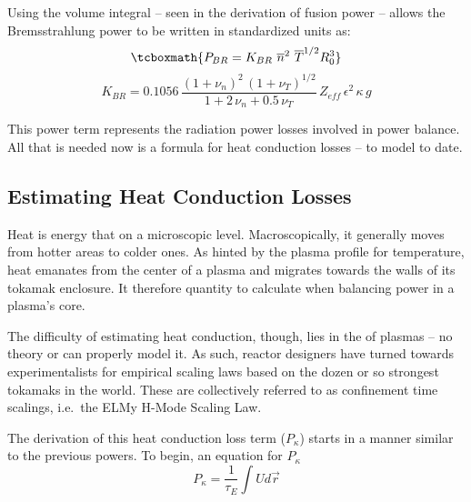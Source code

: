 Using the volume integral -- seen in the derivation of fusion power -- allows the Bremsstrahlung power to be written in standardized units as:
\begin{equation}
	\label{eq:pbr}
	\tcboxmath{
	P_{BR} = K_{BR} \ \overline n ^ 2 \ \overline T ^ {1/2} R_0^3
	}
\end{equation}
\begin{equation}
	K_{BR} = 0.1056 \, \frac{ (1+\nu_n)^2 \, (1+\nu_T)^{1/2} }{1+2 \, \nu_n + 0.5 \, \nu_T} \, Z_{eff} \, \epsilon^2 \, \kappa \, g
\end{equation}

This power term represents the radiation power losses involved in power balance. All that is needed now is a formula for heat conduction losses --  to model to date.

\subsection{Estimating Heat Conduction Losses}

Heat is energy that  on a microscopic level. Macroscopically, it generally moves from hotter areas to colder ones. As hinted by the plasma profile for temperature, heat emanates from the center of a plasma and migrates towards the walls of its tokamak enclosure. It therefore  quantity to calculate when balancing power in a plasma's core.

The difficulty of estimating heat conduction, though, lies in the  of plasmas -- no theory or  can properly model it. As such, reactor designers have turned towards experimentalists for empirical scaling laws based on the dozen or so strongest tokamaks in the world. These are collectively referred to as confinement time scalings, i.e.\ the ELMy H-Mode Scaling Law.

The derivation of this heat conduction loss term ($P_\kappa$) starts in a manner similar to the previous powers. To begin, an equation for $P_\kappa$ 
\begin{equation}
	P_\kappa = \frac{1}{\tau_E} \int U d \vec r
\end{equation}

